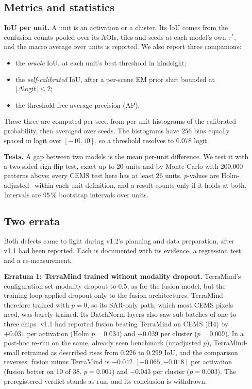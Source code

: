 \documentclass[10pt,twocolumn,a4paper]{article}
\newcommand{\pp}{\,\%}
\begin{document}
\subsection{Metrics and statistics}\label{sec:metrics}
\textbf{IoU per unit.} A unit is an activation or a cluster. Its IoU comes from the confusion counts pooled over its
AOIs, tiles and seeds at each model's own $\tau^{*}$, and the macro average over units is reported. We also report
three companions:
\begin{itemize}
  \item the \emph{oracle} IoU, at each unit's best threshold in hindsight;
  \item the \emph{self-calibrated} IoU, after a per-scene EM prior shift bounded at $|\Delta\mathrm{logit}|\leq2$;
  \item the threshold-free average precision (AP).
\end{itemize}
These three are computed per seed from per-unit histograms of the calibrated probability, then averaged over seeds.
The histograms have 256 bins equally spaced in logit over $[-10, 10]$, so a threshold resolves to 0.078 logit.

\textbf{Tests.} A gap between two models is the mean per-unit difference. We test it with a two-sided sign-flip test, exact
up to 20 units and by Monte Carlo with 200,000 patterns above; every CEMS test here has at least 26 units. $p$-values are Holm-adjusted~\citep{holm1979}
within each unit definition, and a result counts only if it holds at both. Intervals are 95\pp{} bootstrap intervals
over units.

\subsection{Two errata}\label{sec:errata}
Both defects came to light during v1.2's planning and data preparation, after v1.1 had been reported. Each is
documented with its evidence, a regression test and a re-measurement.

\textbf{Erratum 1: TerraMind trained without modality dropout.} TerraMind's configuration set modality dropout to
0.5, as for the fusion model, but the training loop applied dropout only to the fusion architectures. TerraMind therefore
trained with $p=0$, so its SAR-only path, which most CEMS pixels need, was barely trained. Its BatchNorm layers also
saw sub-batches of one to three chips. v1.1 had reported fusion beating TerraMind on CEMS (H4) by $+0.031$ per
activation (Holm $p=0.034$) and $+0.039$ per cluster ($p=0.009$). In a post-hoc re-run on the same, already seen
benchmark (unadjusted $p$), TerraMind-small retrained as described rises from 0.226 to 0.299 IoU, and the comparison
reverses: fusion minus TerraMind is $-0.042$ $[-0.065, -0.018]$ per
activation (fusion better on 10 of 38, $p=0.001$) and $-0.043$ per cluster ($p=0.003$). The preregistered verdict
stands as run, and its conclusion is withdrawn.
\end{document}
